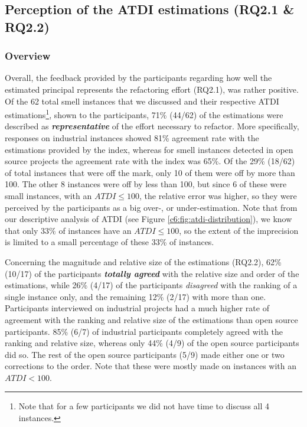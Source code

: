 \subsection{Perception of the ATDI estimations (RQ2.1 \& RQ2.2)}
\subsubsection{Overview}
Overall, the feedback provided by the participants regarding how well the estimated principal represents the refactoring effort (RQ2.1), was rather positive.
Of the 62 total smell instances that we discussed and their respective ATDI estimations\footnote{Note that for a few participants we did not have time to discuss all 4 instances.}, shown to the participants, 71\% (44/62) of the estimations were described as \emph{\textbf{representative}} of the effort necessary to refactor.
More specifically, responses on industrial instances showed 81\% agreement rate with the estimations provided by the index, whereas for smell instances detected in open source projects the agreement rate with the index was 65\%.
Of the 29\% (18/62) of total instances that were off the mark, only 10 of them were off by more than 100. 
The other 8 instances were off by less than 100, but since 6 of these were small instances, with an $ATDI \le 100$, the relative error was higher, so they were perceived by the participants as a big over-, or under-estimation.
Note that from our descriptive analysis of ATDI (see Figure \ref{c6:fig:atdi-distribution}), we know that only 33\% of instances have an $ATDI \le 100$, so the extent of the imprecision is limited to a small percentage of these 33\% of instances.

Concerning the magnitude and relative size of the estimations (RQ2.2), 62\% (10/17) of the participants \emph{\textbf{totally agreed}} with the relative size and order of the estimations, while 26\% (4/17) of the participants \emph{disagreed} with the ranking of a single instance only, and the remaining 12\% (2/17) with more than one.
Participants interviewed on industrial projects had a much higher rate of agreement with the ranking and relative size of the estimations than open source participants.
85\% (6/7) of industrial participants completely agreed with the ranking and relative size, whereas only 44\% (4/9) of the open source participants did so.
The rest of the open source participants (5/9) made either one or two corrections to the order.
Note that these were mostly made on instances with an $ATDI < 100$.


